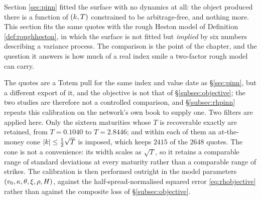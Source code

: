 Section \ref{sec:pinn} fitted the surface with no dynamics at all: the object produced there is a
function of $(k,T)$ constrained to be arbitrage-free, and nothing more. This section fits the
same quotes with the rough Heston model of Definition \ref{def:roughheston}, in which the surface is
not fitted but \emph{implied} by six numbers describing a variance process. The comparison is the
point of the chapter, and the question it answers is how much of a real index smile a two-factor
rough model can carry.

The quotes are a Totem pull for the same index and value date as \S\ref{sec:pinn}, but a
different export of it, and the objective is not that of \S\ref{subsec:objective}; the two
studies are therefore not a controlled comparison, and \S\ref{subsec:rhpinn} repeats this
calibration on the network's own book to supply one. Two
filters are applied here. Only the sixteen maturities whose $T$ is recoverable exactly are retained,
from $T=0.1040$ to $T=2.8446$; and within each of them an at-the-money cone
$|k|\le\tfrac12\sqrt{T}$ is imposed, which keeps $2415$ of the $2648$ quotes. The cone is not a
convenience: its width scales as $\sqrt{T}$, so it retains a comparable range of standard deviations
at every maturity rather than a comparable range of strikes. The calibration is then performed
outright in the model parameters $(v_{0},\kappa,\theta,\xi,\rho,H)$, against the
half-spread-normalised squared error \eqref{eq:rhobjective} rather than against the composite loss
of \S\ref{subsec:objective}.






